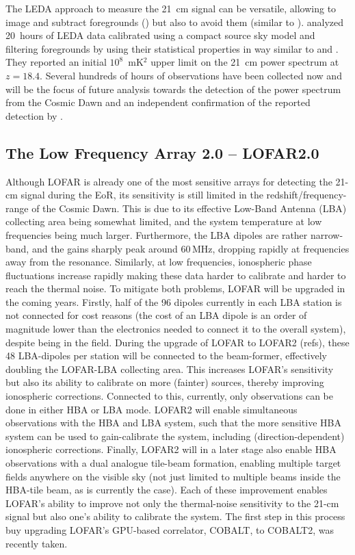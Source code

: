 %
The LEDA approach to measure the 21~cm signal can be versatile, allowing to image and subtract foregrounds (\cite{eastwood18}) but also to avoid them (similar to \cite{beardsley16}). \cite{eastwood19} analyzed 20~hours of LEDA data calibrated using a compact source sky model and filtering foregrounds by using their statistical properties in way similar to \cite{dillon14} and \cite{trott16}. They reported an initial $10^8$~mK$^2$ upper limit on the 21~cm power spectrum at $z = 18.4$. Several hundreds of hours of observations have been collected now and will be the focus of future analysis towards the detection of the power spectrum from the Cosmic Dawn and an independent confirmation of the reported detection by \cite{bowman18}.

\subsection{The Low Frequency Array 2.0 -- LOFAR2.0}
\label{section:lofar}

Although LOFAR is already one of the most sensitive arrays for detecting the 21-cm signal during the EoR, its sensitivity is still limited in the redshift/frequency-range of the Cosmic Dawn. This is due to its effective Low-Band Antenna (LBA) collecting area being somewhat limited, and the system temperature at low frequencies being much larger. Furthermore, the LBA dipoles are rather narrow-band, and the gains sharply peak around 60\,MHz, dropping rapidly at frequencies away from the resonance. Similarly, at low frequencies,  ionospheric phase fluctuations increase rapidly making these data harder to calibrate and harder to reach the thermal noise. To mitigate both problems, LOFAR will be upgraded in the coming years. Firstly, half of the 96 dipoles currently in each LBA station is not connected for cost reasons (the cost of an LBA dipole is an order of magnitude lower than the electronics needed to connect it to the overall system), despite being in the field. During the upgrade of LOFAR to LOFAR2 (refs), these 48 LBA-dipoles per station will be connected to the beam-former, effectively doubling the LOFAR-LBA collecting area. This increases LOFAR's sensitivity but also its ability to calibrate on more (fainter) sources, thereby improving ionospheric corrections. Connected to this, currently, only observations can be done in either HBA or LBA mode. LOFAR2 will enable simultaneous observations with the HBA and LBA system, such that the more sensitive HBA system can be used to gain-calibrate the system, including (direction-dependent) ionospheric corrections. Finally, LOFAR2 will in a later stage also enable HBA observations with a dual analogue tile-beam formation, enabling multiple target fields anywhere on the visible sky (not just limited to multiple beams inside the HBA-tile beam, as is currently the case). Each of these improvement enables LOFAR's ability to improve not only the thermal-noise sensitivity to the 21-cm signal but also one's ability to calibrate the system. The first step in this process buy upgrading LOFAR's GPU-based correlator, COBALT, to COBALT2, was recently taken.  

